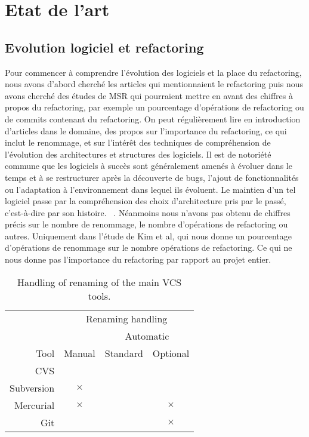 \section{Etat de l'art}
\label{sec:etat_de_lart}

\subsection{Evolution logiciel et refactoring}
Pour commencer à comprendre l'évolution des logiciels et la place du refactoring, nous avons d'abord cherché les articles qui mentionnaient le refactoring puis nous avons cherché des études de MSR qui pourraient mettre en avant des chiffres à propos du refactoring, par exemple un pourcentage d'opérations de refactoring ou de commits contenant du refactoring. On peut régulièrement lire en introduction d'articles dans le domaine, des propos sur l'importance du refactoring, ce qui inclut le renommage, et sur l'intérêt des techniques de compréhension de l’évolution des architectures et structures des logiciels. Il est de notoriété commune que les logiciels à succès sont généralement amenés à évoluer dans le temps et à se restructurer après la découverte de bugs, l’ajout de fonctionnalités ou l’adaptation à l’environnement dans lequel ils évoluent. Le maintien d’un tel logiciel passe par la compréhension des choix d’architecture pris par le passé, c'est-à-dire par son histoire. ~\cite{tu_integrated_2002,godfrey_tracking_2002,kim_field_2012}. Néanmoins nous n'avons pas obtenu de chiffres précis sur le nombre de renommage, le nombre d'opérations de refactoring ou autres. Uniquement dans l'étude de Kim et al, qui nous donne un pourcentage d'opérations de renommage sur le nombre opérations de refactoring. Ce qui ne nous donne pas l'importance du refactoring par rapport au projet entier.\\

\begin{table}
\centering
\begin{tabular}{rccc}
\toprule
 & \multicolumn{3}{c}{Renaming handling}\\
\cmidrule{2-4}
& & \multicolumn{2}{c}{Automatic}\\
\cmidrule{3-4}
Tool & Manual & Standard & Optional\\
\midrule
CVS & & &\\
Subversion & $\times$ & &\\
Mercurial & $\times$ & & $\times$\\
Git & & & $\times$\\
\bottomrule
\end{tabular}
\caption{Handling of renaming of the main VCS tools.}
\label{tab:vcs}
\end{table}

